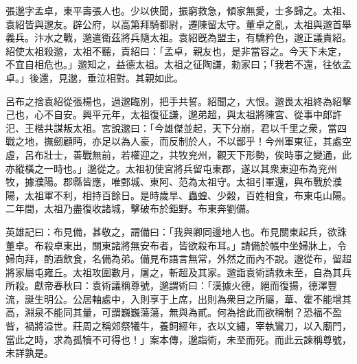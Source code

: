 
\begin{pinyinscope}
張邈字孟卓，東平壽張人也。少以俠聞，振窮救急，傾家無愛，士多歸之。太祖、袁紹皆與邈友。辟公府，以高第拜騎都尉，遷陳留太守。董卓之亂，太祖與邈首舉義兵。汴水之戰，邈遣衞茲將兵隨太祖。袁紹旣為盟主，有驕矜色，邈正議責紹。紹使太祖殺邈，太祖不聽，責紹曰：「孟卓，親友也，是非當容之。今天下未定，不宜自相危也。」邈知之，益德太祖。太祖之征陶謙，勑家曰；「我若不還，往依孟卓。」後還，見邈，垂泣相對。其親如此。

呂布之捨袁紹從張楊也，過邈臨別，把手共誓。紹聞之，大恨。邈畏太祖終為紹擊己也，心不自安。興平元年，太祖復征謙，邈弟超，與太祖將陳宮、從事中郎許汜、王楷共謀叛太祖。宮說邈曰：「今雄傑並起，天下分崩，君以千里之衆，當四戰之地，撫劒顧眄，亦足以為人豪，而反制於人，不以鄙乎！今州軍東征，其處空虛，呂布壯士，善戰無前，若權迎之，共牧兖州，觀天下形勢，俟時事之變通，此亦縱橫之一時也。」邈從之。太祖初使宮將兵留屯東郡，遂以其衆東迎布為兖州牧，據濮陽。郡縣皆應，唯鄄城、東阿、范為太祖守。太祖引軍還，與布戰於濮陽，太祖軍不利，相持百餘日。是時歲旱、蟲蝗、少穀，百姓相食，布東屯山陽。二年間，太祖乃盡復收諸城，擊破布於鉅野。布東奔劉備。

英雄記曰：布見備，甚敬之，謂備曰：「我與卿同邊地人也。布見關東起兵，欲誅董卓。布殺卓東出，關東諸將無安布者，皆欲殺布耳。」請備於帳中坐婦牀上，令婦向拜，酌酒飲食，名備為弟。備見布語言無常，外然之而內不說。邈從布，留超將家屬屯雍丘。太祖攻圍數月，屠之，斬超及其家。邈詣袁術請救未至，自為其兵所殺。獻帝春秋曰：袁術議稱尊號，邈謂術曰：「漢據火德，絕而復揚，德澤豐流，誕生明公。公居軸處中，入則享于上席，出則為衆目之所屬，華、霍不能增其高，淵泉不能同其量，可謂巍巍蕩蕩，無與為貳。何為捨此而欲稱制？恐福不盈眥，禍將溢世。莊周之稱郊祭犧牛，養飼經年，衣以文繡，宰執鸞刀，以入廟門，當此之時，求為孤犢不可得也！」案本傳，邈詣術，未至而死。而此云諫稱尊號，未詳孰是。


\end{pinyinscope}
